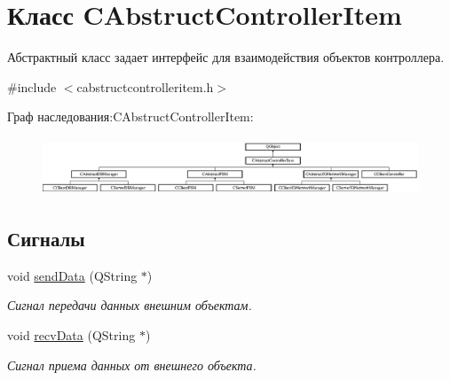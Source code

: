 \hypertarget{class_c_abstruct_controller_item}{}\section{Класс C\+Abstruct\+Controller\+Item}
\label{class_c_abstruct_controller_item}


Абстрактный класс задает интерфейс для взаимодействия объектов контроллера.  




{\ttfamily \#include $<$cabstructcontrolleritem.\+h$>$}

Граф наследования\+:C\+Abstruct\+Controller\+Item\+:\begin{figure}[H]
\begin{center}
\leavevmode
\includegraphics[height=1.720430cm]{class_c_abstruct_controller_item}
\end{center}
\end{figure}
\subsection*{Сигналы}
\begin{DoxyCompactItemize}
\item 
\hypertarget{class_c_abstruct_controller_item_a7cf2bebc87a7d0b660318e946a176eb9}{}\label{class_c_abstruct_controller_item_a7cf2bebc87a7d0b660318e946a176eb9} 
void \hyperlink{class_c_abstruct_controller_item_a7cf2bebc87a7d0b660318e946a176eb9}{send\+Data} (Q\+String $\ast$)
\begin{DoxyCompactList}\small\item\em Сигнал передачи данных внешним объектам. \end{DoxyCompactList}\item 
\hypertarget{class_c_abstruct_controller_item_a6898e48061cb0cac2065f8193bd386c1}{}\label{class_c_abstruct_controller_item_a6898e48061cb0cac2065f8193bd386c1} 
void \hyperlink{class_c_abstruct_controller_item_a6898e48061cb0cac2065f8193bd386c1}{recv\+Data} (Q\+String $\ast$)
\begin{DoxyCompactList}\small\item\em Сигнал приема данных от внешнего объекта. \end{DoxyCompactList}\end{DoxyCompactItemize}
